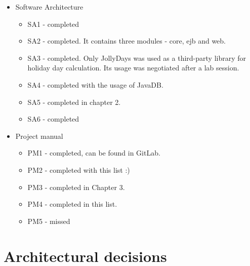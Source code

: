 \documentclass{article}
\begin{document}
\begin{itemize}
\item Software Architecture
\begin{itemize}
\item SA1 - completed
\item SA2 - completed. It contains three modules - core, ejb and web.
\item SA3 - completed. Only JollyDays was used as a third-party library for holiday day calculation. Its usage was negotiated after a lab session.
\item SA4 - completed with the usage of JavaDB.
\item SA5 - completed in chapter 2.
\item SA6 - completed
\end{itemize}
\item Project manual
\begin{itemize}
\item PM1 - completed, can be found in GitLab.
\item PM2 - completed with this list :)
\item PM3 - completed in Chapter 3.
\item PM4 - completed in this list.
\item PM5 - missed
\end{itemize}
\end{itemize}
\newpage
\section{Architectural decisions}
\end{document}
